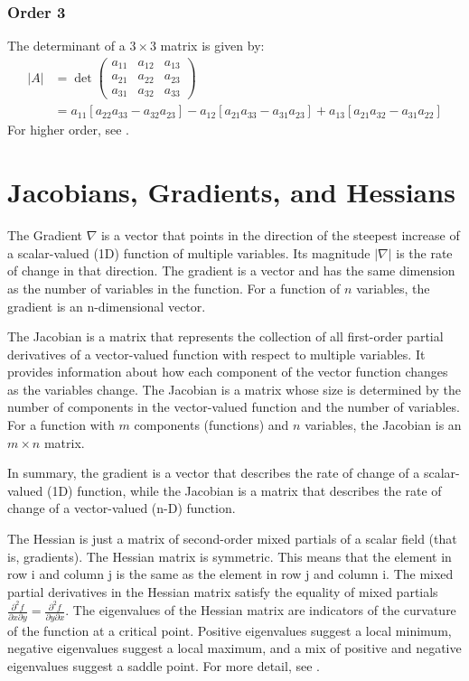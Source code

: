 \documentclass[11pt,a4paper]{book}
\theoremstyle{definition}\newtheorem{definition}{Definition}
\theoremstyle{definition}\newtheorem{fact}{Fact}
\theoremstyle{definition}\newtheorem{remark}{Remark}
\theoremstyle{definition}\newtheorem{ex}{Ex.}
\theoremstyle{definition}\newtheorem{project}{Project}
\theoremstyle{definition}\newtheorem{problem}{Problem}
\theoremstyle{definition}\newtheorem{example}{Example}
\numberwithin{theorem}{section}
\numberwithin{corollary}{chapter}
\numberwithin{assumption}{chapter}
\numberwithin{definition}{chapter}
\numberwithin{prop}{chapter}
\numberwithin{notation}{chapter}
\numberwithin{problem}{chapter}
\numberwithin{example}{chapter}
\numberwithin{fact}{chapter}
\numberwithin{ex}{chapter}
\begin{document}
\begin{appendices}
	\subsubsection*{Order 3}
	The determinant of a $3\times 3$ matrix is given by:
	\begin{align*}
		|A| &= \det \begin{pmatrix}
			a_{11} & a_{12} & a_{13} \\
			a_{21} & a_{22} & a_{23} \\
			a_{31} & a_{32} & a_{33} 
		\end{pmatrix} \\
		&= a_{11} [a_{22}a_{33} - a_{32}a_{23}] 
		- a_{12}[a_{21}a_{33} - a_{31}a_{23}] 
		+ a_{13}[a_{21}a_{32} - a_{31}a_{22}]
	\end{align*}
	For higher order, see \citet[Ch. 9.4.2]{springcamp}. 
	
	\section{Jacobians, Gradients, and Hessians}
	The Gradient $\nabla$ is a vector that points in the direction of the steepest increase of a scalar-valued (1D) function of multiple variables. Its magnitude $|\nabla |$ is the rate of change in that direction. The gradient is a vector and has the same dimension as the number of variables in the function. For a function of $n$ variables, the gradient is an n-dimensional vector.
	
	The Jacobian is a matrix that represents the collection of all first-order partial derivatives of a vector-valued function with respect to multiple variables. It provides information about how each component of the vector function changes as the variables change. The Jacobian is a matrix whose size is determined by the number of components in the vector-valued function and the number of variables. For a function with $m$ components (functions) and $n$ variables, the Jacobian is an $m \times n$ matrix.
	
	In summary, the gradient is a vector that describes the rate of change of a scalar-valued (1D) function, while the Jacobian is a matrix that describes the rate of change of a vector-valued (n-D) function.
	
	The Hessian is just a matrix of second-order mixed partials of a scalar field (that is, gradients). The Hessian matrix is symmetric. This means that the element in row 
	i and column 
	j is the same as the element in row 
	j and column 
	i.
	The mixed partial derivatives in the Hessian matrix satisfy the equality of mixed partials $\frac{\partial^2 f}{\partial x \partial y} = \frac{\partial^2 f}{\partial y\partial x}$. The eigenvalues of the Hessian matrix are indicators of the curvature of the function at a critical point. Positive eigenvalues suggest a local minimum, negative eigenvalues suggest a local maximum, and a mix of positive and negative eigenvalues suggest a saddle point. For more detail, see \citet[Ch 10]{springcamp}.
	

\end{appendices}
\end{document}
